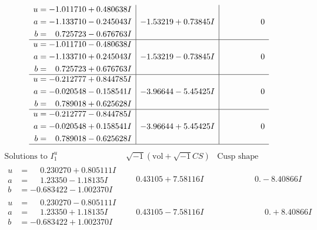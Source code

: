 \documentclass[1p]{elsarticle_modified}
\theoremstyle{definition}
\newcommand{\I}{\sqrt{-1}}
\begin{document}
$$\begin{array}{c|c|c}
\begin{aligned}
u &= -1.011710 + 0.480638 I \\
a &= -1.133710 - 0.245043 I \\
b &= \phantom{-}0.725723 - 0.676763 I\end{aligned}
 & -1.53219 + 0.73845 I & \phantom{-0.000000 } 0 \\ \hline\begin{aligned}
u &= -1.011710 - 0.480638 I \\
a &= -1.133710 + 0.245043 I \\
b &= \phantom{-}0.725723 + 0.676763 I\end{aligned}
 & -1.53219 - 0.73845 I & \phantom{-0.000000 } 0 \\ \hline\begin{aligned}
u &= -0.212777 + 0.844785 I \\
a &= -0.020548 - 0.158541 I \\
b &= \phantom{-}0.789018 + 0.625628 I\end{aligned}
 & -3.96644 - 5.45425 I & \phantom{-0.000000 } 0 \\ \hline\begin{aligned}
u &= -0.212777 - 0.844785 I \\
a &= -0.020548 + 0.158541 I \\
b &= \phantom{-}0.789018 - 0.625628 I\end{aligned}
 & -3.96644 + 5.45425 I & \phantom{-0.000000 } 0\\
 \hline 
 \end{array}$$\newpage$$\begin{array}{c|c|c}  
\text{Solutions to }I^u_{1}& \I (\text{vol} + \sqrt{-1}CS) & \text{Cusp shape}\\
 \hline 
\begin{aligned}
u &= \phantom{-}0.230270 + 0.805111 I \\
a &= \phantom{-}1.23350 - 1.18135 I \\
b &= -0.683422 - 1.002370 I\end{aligned}
 & \phantom{-}0.43105 + 7.58116 I & \phantom{-0.000000 } 0. - 8.40866 I \\ \hline\begin{aligned}
u &= \phantom{-}0.230270 - 0.805111 I \\
a &= \phantom{-}1.23350 + 1.18135 I \\
b &= -0.683422 + 1.002370 I\end{aligned}
 & \phantom{-}0.43105 - 7.58116 I & \phantom{-0.000000 -}0. + 8.40866 I \\ \hline\begin{aligned}

\end{aligned}
\end{array}$$
\end{document}
